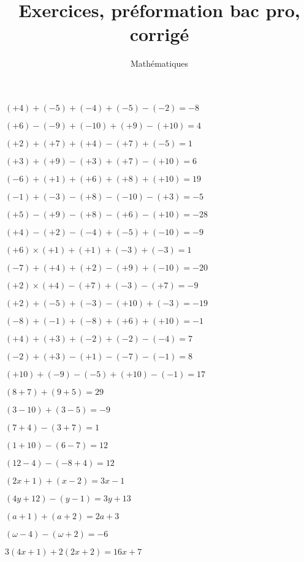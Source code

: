 \documentclass[a4paper,12pt]{scrartcl}
\date{}
\title{Exercices, préformation bac pro, corrigé}
\author{Mathématiques}
\begin{document}
\maketitle


\question{}
$(+4)+(-5)+(-4)+(-5)-(-2) = -8$

\question{}
$(+6)-(-9)+(-10)+(+9)-(+10) = 4$

\question{}
$(+2)+(+7)+(+4)-(+7)+(-5) = 1$

\question{}
$(+3)+(+9)-(+3)+(+7)-(+10) = 6$

\question{}
$(-6)+(+1)+(+6)+(+8)+(+10) = 19$

\question{}
$(-1)+(-3)-(+8)-(-10)-(+3) = -5$

\question{}
$(+5)-(+9)-(+8)-(+6)-(+10) = -28$

\question{}
$(+4)-(+2)-(-4)+(-5)+(-10) = -9$


\question{}
$(+6)\times(+1)+(+1)+(-3)+(-3) = 1$

\question{}
$(-7)+(+4)+(+2)-(+9)+(-10) = -20$

\question{}
$(+2)\times(+4)-(+7)+(-3)-(+7) = -9$

\question{}
$(+2)+(-5)+(-3)-(+10)+(-3) = -19$

\question{}
$(-8)+(-1)+(-8)+(+6)+(+10) = -1$

\question{}
$(+4)+(+3)+(-2)+(-2)-(-4) = 7$

\question{}
$(-2)+(+3)-(+1)-(-7)-(-1) = 8$

\question{}
$(+10)+(-9)-(-5)+(+10)-(-1) = 17$


\question{}
$(8+7)+(9+5) = 29$

\question{}
$(3-10)+(3-5) = -9$

\question{}
$(7+4)-(3+7) = 1$

\question{}
$(1+10)-(6-7) = 12$

\question{}
$(12-4)-(-8+4) = 12$

\exo{}

\question{}
$(2x+1)+(x-2) = 3x-1$

\question{}
$(4y+12)-(y-1) = 3y+13$

\question{}
$(a+1)+(a+2) = 2a+3$

\question{}
$(\omega - 4)-(\omega + 2) = -6$

\exo{}

\question{}
$3(4x+1)+2(2x+2) = 16x + 7$
\end{document}
